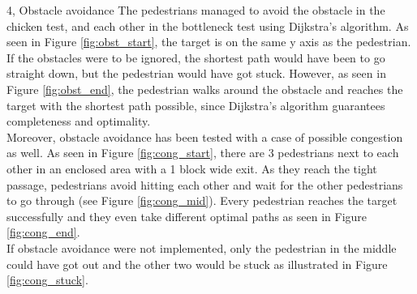 \documentclass[10pt,a4paper]{article}
\begin{document}
\begin{task}{4, Obstacle avoidance}
The pedestrians managed to avoid the obstacle in the chicken test, and each other in the bottleneck test using Dijkstra’s algorithm.
As seen in Figure \ref{fig:obst_start}, the target is on the same y axis as the pedestrian. If the obstacles were to be ignored, the shortest path would have been to go straight down, but the pedestrian would have got stuck. However, as seen in Figure \ref{fig:obst_end}, the pedestrian walks around the obstacle and reaches the target with the shortest path possible, since Dijkstra’s algorithm guarantees completeness and optimality. \\
Moreover, obstacle avoidance has been tested with a case of possible congestion as well. As seen in Figure \ref{fig:cong_start}, there are 3 pedestrians next to each other in an enclosed area with a 1 block wide exit. As they reach the tight passage, pedestrians avoid hitting each other and wait for the other pedestrians to go through (see Figure \ref{fig:cong_mid}). Every pedestrian reaches the target successfully and they even take different optimal paths as seen in Figure \ref{fig:cong_end}. \\
If obstacle avoidance were not implemented, only the pedestrian in the middle could have got out and the other two would be stuck as illustrated in Figure \ref{fig:cong_stuck}. \\
\end{task}
\end{document}
